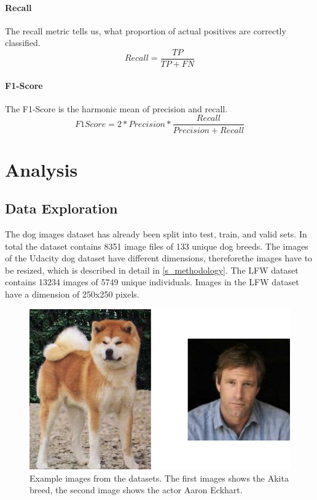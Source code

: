 \documentclass{article}
\begin{document}
\paragraph{Recall} The recall metric tells us, what proportion of actual positives are correctly classified.
\begin{equation}
Recall = \frac{TP}{TP + FN}
\end{equation}

\paragraph{F1-Score} The F1-Score is the harmonic mean of precision and recall.
\begin{equation}
F1 Score = 2 * Precision * \frac{Recall}{Precision + Recall}
\end{equation}

\section{Analysis} \label{s_analysis}

\subsection{Data Exploration}
The dog images dataset has already been split into test, train, and valid sets. In total the dataset contains 8351 image files of 133 unique dog breeds. The images of the Udacity dog dataset have different dimensions, thereforethe images have to be resized, which is described in detail in \ref{s_methodology}. The LFW dataset contains 13234 images of 5749 unique individuals. Images in the LFW dataset have a dimension of 250x250 pixels.

\begin{figure}[h]
    \centering
    \includegraphics[scale=0.35]{./images/dataset_example}
    \caption{Example images from the datasets. The first images shows the Akita breed, the second image shows the actor Aaron Eckhart.}
    \label{fig:dataset_example}
\end{figure}
\end{document}

